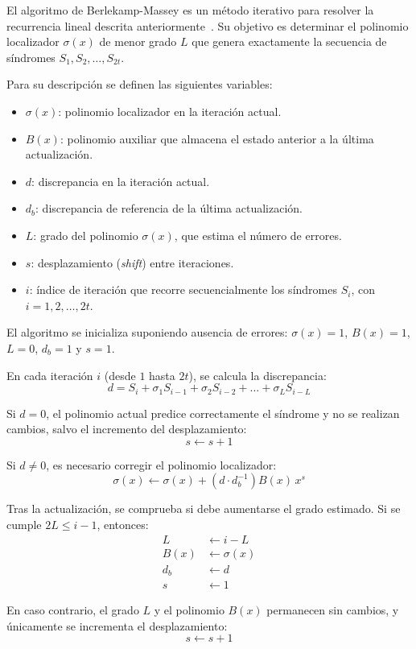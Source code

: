 El algoritmo de Berlekamp-Massey es un método iterativo para resolver la recurrencia lineal descrita anteriormente~\cite{lin2004error}. Su objetivo es determinar el polinomio localizador $\sigma(x)$ de menor grado $L$ que genera exactamente la secuencia de síndromes $S_1, S_2, \dots, S_{2t}$.

Para su descripción se definen las siguientes variables:
\begin{itemize}
    \item $\sigma(x)$: polinomio localizador en la iteración actual.
    \item $B(x)$: polinomio auxiliar que almacena el estado anterior a la última actualización.
    \item $d$: discrepancia en la iteración actual.
    \item $d_b$: discrepancia de referencia de la última actualización.
    \item $L$: grado del polinomio $\sigma(x)$, que estima el número de errores.
    \item $s$: desplazamiento (\textit{shift}) entre iteraciones.
    \item $i$: índice de iteración que recorre secuencialmente los síndromes $S_i$, con $i = 1, 2, \dots, 2t$.
\end{itemize}

El algoritmo se inicializa suponiendo ausencia de errores: $\sigma(x) = 1$, $B(x) = 1$, $L = 0$, $d_b = 1$ y $s = 1$.

En cada iteración $i$ (desde $1$ hasta $2t$), se calcula la discrepancia:
$$ d = S_i + \sigma_1 S_{i-1} + \sigma_2 S_{i-2} + \dots + \sigma_L S_{i-L} $$

Si $d = 0$, el polinomio actual predice correctamente el síndrome y no se realizan cambios, salvo el incremento del desplazamiento:
$$ s \leftarrow s + 1 $$

Si $d \neq 0$, es necesario corregir el polinomio localizador:
$$ \sigma(x) \leftarrow \sigma(x) + \left( d \cdot d_b^{-1} \right) B(x)\, x^s $$

Tras la actualización, se comprueba si debe aumentarse el grado estimado. Si se cumple $2L \leq i - 1$, entonces:
\begin{align*}
L &\leftarrow i - L \\
B(x) &\leftarrow \sigma(x) \\
d_b &\leftarrow d \\
s &\leftarrow 1
\end{align*}

En caso contrario, el grado $L$ y el polinomio $B(x)$ permanecen sin cambios, y únicamente se incrementa el desplazamiento:
$$ s \leftarrow s + 1 $$

